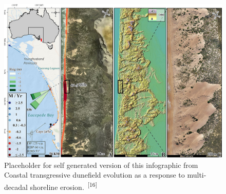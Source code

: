 \documentclass{article}
\begin{document}
\begin{figure}
    \centering
    \includegraphics[width=.9\linewidth]{images/dunes.jpg}
    \caption{Placeholder for self generated version of this infographic from Coastal transgressive dunefield evolution as a response to multi-decadal shoreline erosion.~\textsuperscript{[16]}}
    \label{figure8}
\end{figure}
\end{document}
